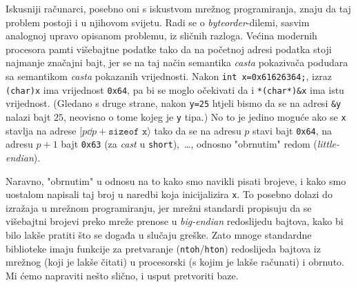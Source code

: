 Iskusniji računarci, posebno oni s iskustvom mrežnog programiranja, znaju da taj problem postoji i u njihovom svijetu. Radi se o \emph{byteorder}-dilemi, sasvim analognoj upravo opisanom problemu, iz sličnih razloga. Većina modernih procesora pamti višebajtne podatke tako da na početnoj adresi podatka stoji najmanje značajni bajt, jer se na taj način semantika \emph{casta} pokazivača podudara sa semantikom \emph{casta} pokazanih vrijednosti. Nakon \texttt{int x=0x61626364;}, izraz \texttt{(char)x} ima vrijednost \texttt{0x64}, pa bi se moglo očekivati da i \texttt{*(char*)\&x} ima istu vrijednost. (Gledano s druge strane, nakon \texttt{y=25} htjeli bismo da se na adresi \texttt{\&y} nalazi bajt $25$, neovisno o tome kojeg je \texttt y tipa.) No to je jedino moguće ako se \texttt x stavlja na adrese $[p\dd p+\texttt{sizeof x}\rangle$ tako da se na adresu $p$ stavi bajt \texttt{0x64}, na adresu $p+1$ bajt \texttt{0x63} (za \emph{cast} u \texttt{short}),~\ldots, odnosno "obrnutim" redom (\emph{little-endian}).

Naravno, "obrnutim" u odnosu na to kako smo navikli pisati brojeve, i kako smo uostalom napisali taj broj u naredbi koja inicijalizira \texttt x. To posebno dolazi do izražaja u mrežnom programiranju, jer mrežni standardi propisuju da se višebajtni brojevi preko mreže prenose u \emph{big-endian} redoslijedu bajtova, kako bi bilo lakše pratiti što se događa u slučaju greške. Zato mnoge standardne biblioteke imaju funkcije za pretvaranje (\texttt{ntoh}/\texttt{hton}) redoslijeda bajtova iz mrežnog (koji je lakše čitati) u procesorski (s kojim je lakše računati) i obrnuto. Mi ćemo napraviti nešto slično, i usput pretvoriti baze.

